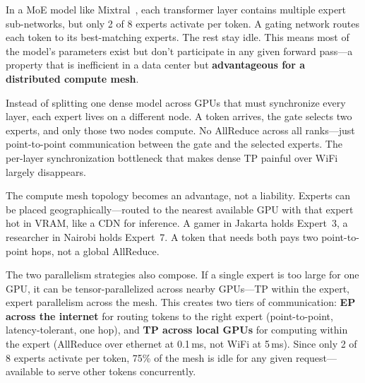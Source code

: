 \documentclass[10pt,twocolumn]{article}
\begin{document}
In a MoE model like Mixtral~\citep{jiang2024mixtral}, each transformer
layer contains multiple expert sub-networks, but only 2 of 8 experts
activate per token.  A gating network routes each token to its
best-matching experts.  The rest stay idle.  This means most of the
model's parameters exist but don't participate in any given forward
pass---a property that is inefficient in a data center but
\textbf{advantageous for a distributed compute mesh}.

Instead of splitting one dense model across GPUs that must synchronize
every layer, each expert lives on a different node.  A token arrives, the
gate selects two experts, and only those two nodes compute.  No AllReduce
across all ranks---just point-to-point communication between the gate and
the selected experts.  The per-layer synchronization bottleneck that makes
dense TP painful over WiFi largely disappears.

The compute mesh topology becomes an advantage, not a liability.  Experts
can be placed geographically---routed to the nearest available GPU with
that expert hot in VRAM, like a CDN for inference.  A gamer in Jakarta
holds Expert~3, a researcher in Nairobi holds Expert~7.  A token that
needs both pays two point-to-point hops, not a global AllReduce.

The two parallelism strategies also compose.  If a single expert is too
large for one GPU, it can be tensor-parallelized across nearby GPUs---TP
within the expert, expert parallelism across the mesh.  This creates two
tiers of communication: \textbf{EP across the internet} for routing tokens
to the right expert (point-to-point, latency-tolerant, one hop), and
\textbf{TP across local GPUs} for computing within the expert (AllReduce
over ethernet at 0.1\,ms, not WiFi at 5\,ms).  Since only 2 of 8 experts
activate per token, 75\% of the mesh is idle for any given
request---available to serve other tokens concurrently.
\end{document}
